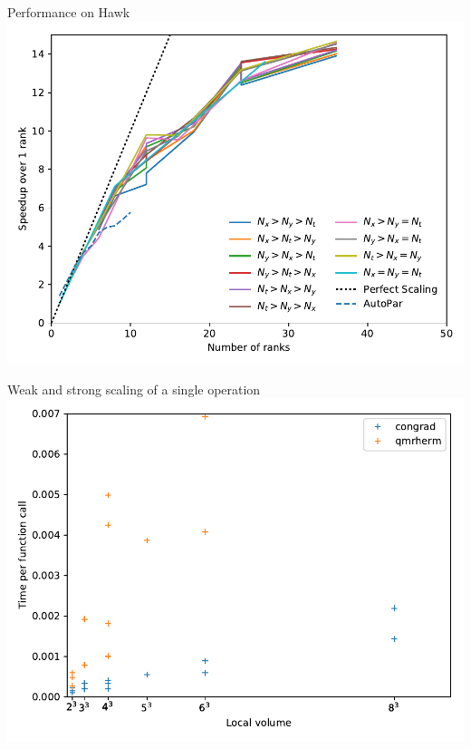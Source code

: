 \documentclass[handout]{beamer}
\begin{document}
\begin{frame}{Performance on Hawk}
	\includegraphics[width=\textwidth]{figs/scaling-hawk2}
\end{frame}

\begin{frame}{Weak and strong scaling of a single operation}
	\includegraphics[width=\textwidth]{figs/precise}
\end{frame}
\end{document}
